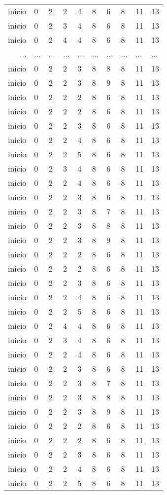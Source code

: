 \documentclass[11pt]{article}
\begin{document}
\begin{tabular}{r|lllllllll}
	inicio & 0  & 2  & 2  & 4  & 8  & 6  & 8  & 11 & 13\\
	inicio & 0  & 2  & 3  & 4  & 8  & 6  & 8  & 11 & 13\\
	inicio & 0  & 2  & 4  & 4  & 8  & 6  & 8  & 11 & 13\\
	... & ... & ... & ... & ... & ... & ... & ... & ... & ...\\
	inicio & 0  & 2  & 2  & 3  & 8  & 8  & 8  & 11 & 13\\
	inicio & 0  & 2  & 2  & 3  & 8  & 9  & 8  & 11 & 13\\
	inicio & 0  & 2  & 2  & 2  & 8  & 6  & 8  & 11 & 13\\
	inicio & 0  & 2  & 2  & 2  & 8  & 6  & 8  & 11 & 13\\
	inicio & 0  & 2  & 2  & 3  & 8  & 6  & 8  & 11 & 13\\
	inicio & 0  & 2  & 2  & 4  & 8  & 6  & 8  & 11 & 13\\
	inicio & 0  & 2  & 2  & 5  & 8  & 6  & 8  & 11 & 13\\
	inicio & 0  & 2  & 3  & 4  & 8  & 6  & 8  & 11 & 13\\
	inicio & 0  & 2  & 2  & 4  & 8  & 6  & 8  & 11 & 13\\
	inicio & 0  & 2  & 2  & 3  & 8  & 6  & 8  & 11 & 13\\
	inicio & 0  & 2  & 2  & 3  & 8  & 7  & 8  & 11 & 13\\
	inicio & 0  & 2  & 2  & 3  & 8  & 8  & 8  & 11 & 13\\
	inicio & 0  & 2  & 2  & 3  & 8  & 9  & 8  & 11 & 13\\
	inicio & 0  & 2  & 2  & 2  & 8  & 6  & 8  & 11 & 13\\
	inicio & 0  & 2  & 2  & 2  & 8  & 6  & 8  & 11 & 13\\
	inicio & 0  & 2  & 2  & 3  & 8  & 6  & 8  & 11 & 13\\
	inicio & 0  & 2  & 2  & 4  & 8  & 6  & 8  & 11 & 13\\
	inicio & 0  & 2  & 2  & 5  & 8  & 6  & 8  & 11 & 13\\
	inicio & 0  & 2  & 4  & 4  & 8  & 6  & 8  & 11 & 13\\
	inicio & 0  & 2  & 3  & 4  & 8  & 6  & 8  & 11 & 13\\
	inicio & 0  & 2  & 2  & 4  & 8  & 6  & 8  & 11 & 13\\
	inicio & 0  & 2  & 2  & 3  & 8  & 6  & 8  & 11 & 13\\
	inicio & 0  & 2  & 2  & 3  & 8  & 7  & 8  & 11 & 13\\
	inicio & 0  & 2  & 2  & 3  & 8  & 8  & 8  & 11 & 13\\
	inicio & 0  & 2  & 2  & 3  & 8  & 9  & 8  & 11 & 13\\
	inicio & 0  & 2  & 2  & 2  & 8  & 6  & 8  & 11 & 13\\
	inicio & 0  & 2  & 2  & 2  & 8  & 6  & 8  & 11 & 13\\
	inicio & 0  & 2  & 2  & 3  & 8  & 6  & 8  & 11 & 13\\
	inicio & 0  & 2  & 2  & 4  & 8  & 6  & 8  & 11 & 13\\
	inicio & 0  & 2  & 2  & 5  & 8  & 6  & 8  & 11 & 13\\
\end{tabular}
\end{document}
